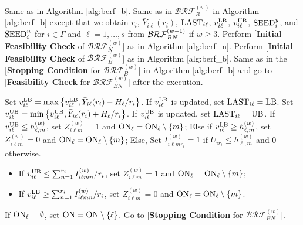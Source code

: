 \documentclass[11pt]{article}
\begin{document}
\begin{algorithm}[h!]
{\fontsize{10}{13}\selectfont	
    \begin{algorithmic}
    \caption{The $w$th Pass of Procedure Bernoulli Recycled Feasibility, $\mathcal{BRF}_{BN}^{(w)}$, where $w\geq 2$}
    \label{alg:berf_bn}
		\State {\bf [Setup:]} Same as in Algorithm \ref{alg:berf_b}.
		\State [{\bf Initialization}:] 
		Same as in $\mathcal{BRF}_B^{(w)}$ in Algorithm \ref{alg:berf_b} except that we obtain $r_i$, $\bar{Y}_{i\ell}(r_i)$, ${\rm LAST}_{i\ell}$, $v_{i\ell}^{\rm LB}$, $v_{i\ell}^{\rm UB}$, ${\rm SEED}_i^y$, and ${\rm SEED}_i^u$ for $i\in \Gamma$ and $\ell=1,\ldots,s$ from ${\cal BRF}_{BN}^{(w-1)}$ if $w\geq 3$.
        \State Perform [{\bf Initial Feasibility Check} of $\mathcal{BRF}_N^{(w)}$] as in Algorithm \ref{alg:berf_n}. 
        \State Perform [{\bf Initial Feasibility Check} of $\mathcal{BRF}_B^{(w)}$] as in Algorithm \ref{alg:berf_b}. 
     Same as in the [{\bf Stopping Condition} for $\mathcal{BRF}_B^{(w)}$] in Algorithm \ref{alg:berf_b} and go to [{\bf Feasibility Check} for $\mathcal{BRF}_{BN}^{(w)}$] after the execution.

       	\State Set $v_{i\ell}^{\rm LB}=\max\left\{v_{i\ell}^{\rm LB}, \bar{Y}_{i\ell}(r_i)-H_\ell/r_i\right\}$. If $v_{i\ell}^{\rm LB}$ is updated, set ${\rm LAST}_{i\ell}={\rm LB}$.
        \State Set $v_{i\ell}^{\rm UB}=\min\left\{v_{i\ell}^{\rm UB}, \bar{Y}_{i\ell}(r_i)+H_\ell/r_i\right\}$. If $v_{i\ell}^{\rm UB}$ is updated, set ${\rm LAST}_{i\ell}={\rm UB}$.
        \State If $v_{i\ell}^{\rm UB}\leq h_{\ell,m}^{(w)}$, set $Z_{i\ell m}^{(w)}=1$ and ${\rm ON}_\ell={\rm ON}_\ell \setminus \{m\}$;
        \State Else if $v_{i\ell}^{\rm LB}\geq h_{\ell, m}^{(w)}$, set $Z_{i\ell m}^{(w)}=0$ and ${\rm ON}_\ell={\rm ON}_\ell \setminus \{m\}$;
	\State Else, 
    \State \hspace{0.8cm} Set $I_{i \ell m r_i}^{(w)}=1$ if $U_{i r_i} \le h_{\ell, m}^{(w)}$ and 0 otherwise.
            \begin{itemize}[leftmargin=2.5  cm]
                \item[] If $v_{i\ell}^{\rm UB}\leq \sum_{n=1}^{r_i} I_{i \ell m n}^{(w)}/r_i$, set $Z_{i\ell m}^{(w)}=1$ and ${\rm ON}_\ell={\rm ON}_\ell \setminus \{m\}$;
                \item[] If $v_{i\ell}^{\rm LB}\geq \sum_{n=1}^{r_i} I_{i \ell m n}^{(w)}/r_i$, set $Z_{i\ell m}^{(w)}=0$ and ${\rm ON}_\ell={\rm ON}_\ell \setminus \{m\}$.
            \end{itemize}
        \EndFor
        \State If ${\rm ON}_\ell=\emptyset$, set ${\rm ON}={\rm ON}\setminus \{\ell\}$.
		\EndFor
        \State Go to [{\bf Stopping Condition} for $\mathcal{BRF}_{BN}^{(w)}$].

	\EndFor%
	\end{algorithmic}
 }
\end{algorithm}
\end{document}
